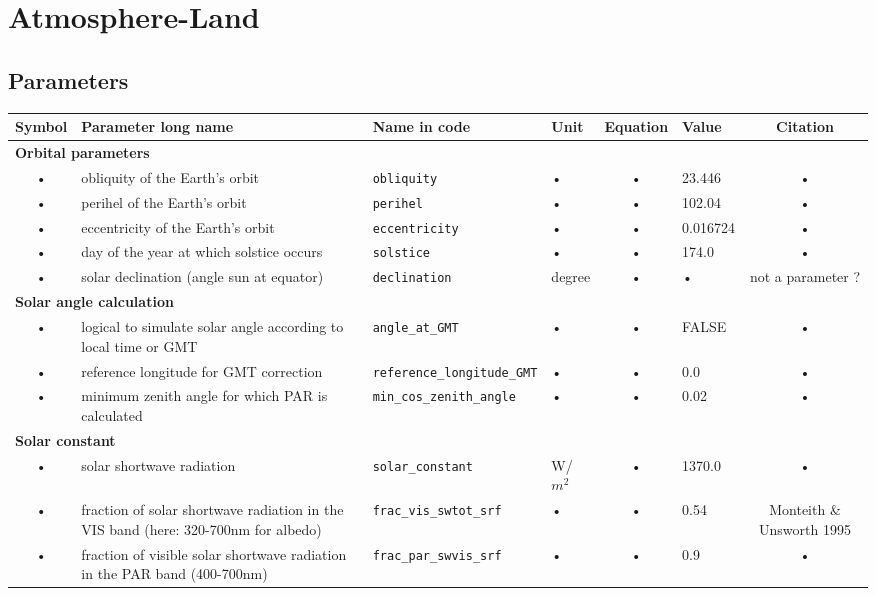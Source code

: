 \chapter{Atmosphere-Land}\label{ch:atmland}




\begin{table}
\section{Parameters}\label{tab:atmland:param}

\begin{tabularx}{\linewidth}{|c|X|l|l|c|l|c|} %
\hline 
Symbol & Parameter long name & Name in code & Unit & Equation & Value & Citation \\ 
\hline 

\multicolumn{6}{l}{\bf Orbital parameters}\\
\hline
• & obliquity of the Earth's orbit & \texttt{obliquity} & • & • & 23.446 & • \\
• & perihel of the Earth's orbit & \texttt{perihel} & • & • & 102.04 & • \\
• & eccentricity of the Earth's orbit & \texttt{eccentricity} & • & • & 0.016724 & • \\
• & day of the year at which solstice occurs & \texttt{solstice} & • & • & 174.0 & • \\
• & solar declination (angle sun at equator) & \texttt{declination} & degree & • & • & not a parameter ? \\
\hline 

\multicolumn{6}{l}{\bf Solar angle calculation}\\
\hline
• & logical to simulate solar angle according to local time or GMT & \texttt{angle\_at\_GMT} & • & • & FALSE & • \\
• & reference longitude for GMT correction & \texttt{reference\_longitude\_GMT} & • & • & 0.0 & • \\
• & minimum zenith angle for which PAR is calculated & \texttt{min\_cos\_zenith\_angle} & • & • & 0.02 & • \\
\hline 

\multicolumn{6}{l}{\bf Solar constant}\\
\hline
• & solar shortwave radiation & \texttt{solar\_constant} & W/$m^2$ & • & 1370.0 & • \\
• & fraction of solar shortwave radiation in the VIS band (here: 320-700nm for albedo) & \texttt{frac\_vis\_swtot\_srf} & • & • & 0.54 & Monteith \& Unsworth 1995 \\
• & fraction of visible solar shortwave radiation in the PAR band (400-700nm) & \texttt{frac\_par\_swvis\_srf} & • & • & 0.9 & • \\
\hline 


\end{tabularx}
\end{table}
